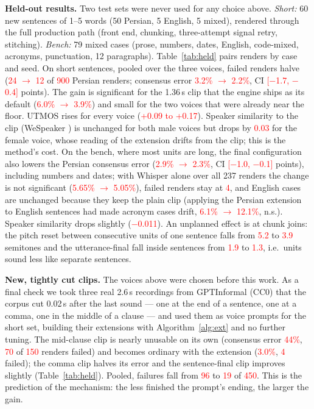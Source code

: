 \documentclass[conference]{IEEEtran}
\newcommand{\RES}[1]{\textcolor{red}{#1}}
\begin{document}
\textbf{Held-out results.} Two test sets were never used for any choice above. \emph{Short:} 60 new
sentences of 1--5 words (50 Persian, 5 English, 5 mixed), rendered through the full production path (front
end, chunking, three-attempt signal retry, stitching). \emph{Bench:} 79 mixed cases (prose, numbers, dates,
English, code-mixed, acronyms, punctuation, 12 paragraphs). Table~\ref{tab:held} pairs renders by case and
seed. On short sentences, pooled over the three voices, failed renders halve (\RES{24 $\to$ 12} of
\RES{900} Persian renders; consensus error \RES{3.2\% $\to$ 2.2\%}, CI \RES{[$-$1.7, $-$0.4]} points). The
gain is significant for the 1.36\,s clip that the engine ships as its default (\RES{6.0\% $\to$ 3.9\%}) and
small for the two voices that were already near the floor. UTMOS \cite{utmos2022} rises for every voice
(\RES{+0.09 to +0.17}). Speaker similarity to the clip (WeSpeaker \cite{wespeaker2023}) is unchanged for both
male voices but drops by \RES{0.03} for the female voice, whose reading of the extension drifts from the
clip; this is the method's cost. On the bench, where most units are long, the final configuration also lowers the
Persian consensus error (\RES{2.9\% $\to$ 2.3\%}, CI \RES{[$-$1.0, $-$0.1]} points), including numbers and
dates; with Whisper alone over all 237 renders the change is not significant (\RES{5.65\% $\to$ 5.05\%}),
failed renders stay at \RES{4}, and English cases are unchanged because they keep the plain clip (applying
the Persian extension to English sentences had made acronym cases drift, \RES{6.1\% $\to$ 12.1\%}, n.s.).
Speaker similarity drops slightly (\RES{$-$0.011}). An unplanned effect is at chunk joins: the pitch reset
between consecutive units of one sentence falls from \RES{5.2} to \RES{3.9} semitones and the
utterance-final fall inside sentences from \RES{1.9} to \RES{1.3}, i.e.\ units sound less like separate
sentences.

\textbf{New, tightly cut clips.} The voices above were chosen before this work. As a final check we took
three real 2.6\,s recordings from GPTInformal (CC0) that the corpus cut 0.02\,s after the last sound --- one
at the end of a sentence, one at a comma, one in the middle of a clause --- and used them as voice prompts
for the short set, building their extensions with Algorithm~\ref{alg:ext} and no further tuning. The
mid-clause clip is nearly unusable on its own (consensus error \RES{44\%}, \RES{70} of \RES{150} renders
failed) and becomes ordinary with the extension (\RES{3.0\%}, \RES{4} failed); the comma clip halves its
error and the sentence-final clip improves slightly (Table~\ref{tab:held}). Pooled, failures fall from
\RES{96} to \RES{19} of \RES{450}. This is the prediction of the mechanism: the less finished the prompt's
ending, the larger the gain.
\end{document}
